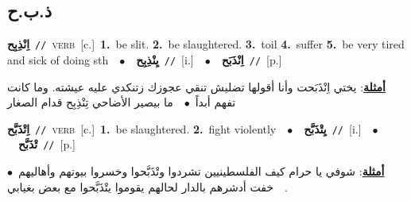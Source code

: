 \documentclass[10pt,a4paper,twoside]{article} %
\begin{document}
\begin{multicols}{2}
\vspace{-3mm}
\subsection*{\color{blue}\foreignlanguage{arabic}{ذ.ب.ح}\color{blue}{}} 

{\setlength\topsep{0pt}\textbf{\foreignlanguage{arabic}{اِنْذِبِح}}\ {\color{gray}\texttt{//}\color{black}}\ \textsc{verb}\ [c.]\ \textbf{1.}~be slit.  \textbf{2.}~be slaughtered.  \textbf{3.}~toil  \textbf{4.}~suffer  \textbf{5.}~be very tired and sick of doing sth\ \ $\bullet$\ \ \setlength\topsep{0pt}\textbf{\foreignlanguage{arabic}{يِنْذِبِح}}\ {\color{gray}\texttt{//}\color{black}}\ [i.]\ \ $\bullet$\ \ \setlength\topsep{0pt}\textbf{\foreignlanguage{arabic}{اِنْذَبَح}}\ {\color{gray}\texttt{//}\color{black}}\ [p.]\  \begin{flushright}\color{gray}\foreignlanguage{arabic}{\textbf{\underline{\foreignlanguage{arabic}{أمثلة}}}: يختي اِنْذَبَحت وأنا أقولها تضليش تنقي عجوزك زتنكدي عليه عيشته. وما كانت تفهم أبداً\ $\bullet$\ \  ما بيصير الأضاحي تِنْذِبِح قدام الصغار}\end{flushright}\color{black}} \vspace{2mm}

{\setlength\topsep{0pt}\textbf{\foreignlanguage{arabic}{اِتْذَبَّح}}\ {\color{gray}\texttt{//}\color{black}}\ \textsc{verb}\ [c.]\ \textbf{1.}~be slaughtered.  \textbf{2.}~fight violently\ \ $\bullet$\ \ \setlength\topsep{0pt}\textbf{\foreignlanguage{arabic}{يِتْذَبَّح}}\ {\color{gray}\texttt{//}\color{black}}\ [i.]\ \ $\bullet$\ \ \setlength\topsep{0pt}\textbf{\foreignlanguage{arabic}{تْذَبَّح}}\ {\color{gray}\texttt{//}\color{black}}\ [p.]\  \begin{flushright}\color{gray}\foreignlanguage{arabic}{\textbf{\underline{\foreignlanguage{arabic}{أمثلة}}}: شوفي يا حرام كيف الفلسطينيين تشردوا وتْذَبَّحوا وخسروا بيوتهم وأهاليهم\ $\bullet$\ \  خفت أدشرهم بالدار لحالهم يقوموا يتْذَبَّحوا مع بعض بغيابي.}\end{flushright}\color{black}} \vspace{2mm}


\end{multicols}
\end{document}
